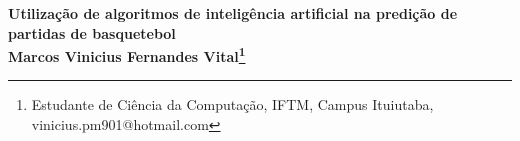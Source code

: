 \thispagestyle{empty}
\begin{center}
\textbf{Utilização de algoritmos de inteligência artificial na predição de partidas de basquetebol \\
Marcos Vinicius Fernandes Vital\footnote[1]{Estudante de Ciência da Computação, IFTM, Campus Ituiutaba, vinicius.pm901@hotmail.com}}
\end{center}